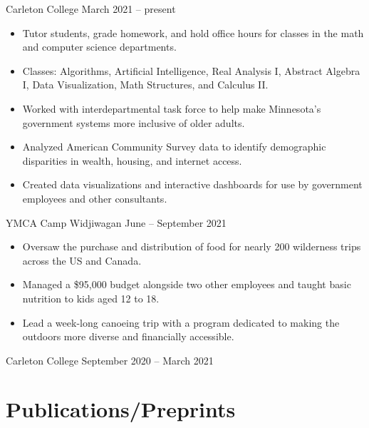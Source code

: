 \documentclass{resume}
\begin{document}
{Carleton College}
{March 2021 -- present}

\begin{itemize}
	\item Tutor students, grade homework, and hold office hours for classes in the math and computer science departments.
	\item Classes:
	      Algorithms,
	      Artificial Intelligence,
	      Real Analysis I,
	      Abstract Algebra I,
	      Data Visualization,
	      Math Structures,
	      and Calculus II.
\end{itemize}


\begin{itemize}
	\item Worked with interdepartmental task force to help make Minnesota's government systems more inclusive of older adults.
	\item Analyzed American Community Survey data to identify demographic disparities in wealth, housing, and internet access.
	\item Created data visualizations and interactive dashboards for use by government employees and other consultants.
\end{itemize}

{YMCA Camp Widjiwagan}
{June -- September 2021}

\begin{itemize}
	\item Oversaw the purchase and distribution of food for nearly 200 wilderness trips across the US and Canada.
	\item Managed a \$95,000 budget alongside two other employees and taught basic nutrition to kids aged 12 to 18.
	\item Lead a week-long canoeing trip with a program dedicated to making the outdoors more diverse and financially accessible.
\end{itemize}

{Carleton College}
{September 2020 -- March 2021}



\smallskip

\section{Publications/Preprints}
\end{document}
